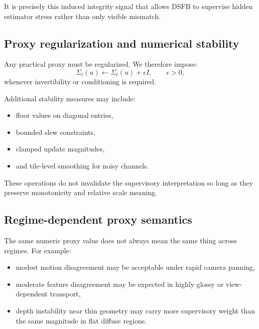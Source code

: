 \documentclass[11pt,letterpaper]{article}
\theoremstyle{gcresult}
\theoremstyle{definition}
\begin{document}
It is precisely this induced integrity signal that allows DSFB to supervise hidden estimator stress rather than only visible mismatch.


\subsection{Proxy regularization and numerical stability}

Any practical proxy must be regularized. We therefore impose:
\begin{equation}
\Sigma_t(u)\leftarrow \Sigma_t(u)+\epsilon I,
\qquad \epsilon>0,
\end{equation}
whenever invertibility or conditioning is required.

Additional stability measures may include:
\begin{itemize}[leftmargin=1.5em]
    \item floor values on diagonal entries,
    \item bounded slew constraints,
    \item clamped update magnitudes,
    \item and tile-level smoothing for noisy channels.
\end{itemize}

These operations do not invalidate the supervisory interpretation so long as they preserve monotonicity and relative scale meaning.


\subsection{Regime-dependent proxy semantics}

The same numeric proxy value does not always mean the same thing across regimes. For example:
\begin{itemize}[leftmargin=1.5em]
    \item modest motion disagreement may be acceptable under rapid camera panning,
    \item moderate feature disagreement may be expected in highly glossy or view-dependent transport,
    \item depth instability near thin geometry may carry more supervisory weight than the same magnitude in flat diffuse regions.
\end{itemize}
\end{document}
